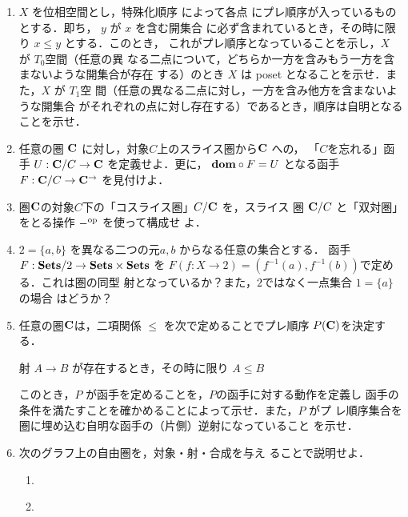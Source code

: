 \begin{enumerate}
\begin{enumerate}
{	      しない}ことを示せ．
       \end{enumerate}
 \item $X$ を位相空間とし，特殊化順序
       によって各点
       にプレ順序が入っているものとする．即ち， $y$ が $x$ を含む開集合
       に必ず含まれているとき，その時に限り $x \leq y$ とする．このとき，
       これがプレ順序となっていることを示し，$X$ が $T_0$空間（任意の異
       なる二点について，どちらか一方を含みもう一方を含まないような開集合が存在
       する）のとき $X$ は poset となることを示せ．また，$X$ が $T_1$空
       間（任意の異なる二点に対し，一方を含み他方を含まないような開集合
       がそれぞれの点に対し存在する）であるとき，順序は自明となることを示せ．
 \item 任意の圏 ${\bf C}$ に対し，対象$C$上のスライス圏から${\bf C}$ への，
       「$C$を忘れる」函手 $U: {\bf C}/C \to {\bf C}$ を定義せよ．更に，
       ${\bf dom} \circ F = U$ となる函手 $F: {\bf C}/C \to {\bf C}^{\to}$
       を見付けよ．
 \item 圏${\bf C}$の対象$C$下の「コスライス圏」$C/{\bf C}$ を，スライス
       圏 ${\bf C}/C$ と「双対圏」をとる操作 $-^{\rm op}$ を使って構成せ
       よ．
 \item $2 = \{a, b\}$ を異なる二つの元$a, b$ からなる任意の集合とする．
       函手 $F: \mathbf{Sets}/2 \to \mathbf{Sets} \times \mathbf{Sets}$ を
       $F(f: X \to 2) = (f^{-1}(a), f^{-1}(b))$で定める．これは圏の同型
       射となっているか？また，$2$ではなく一点集合 $1 = \{a\}$ の場合
       はどうか？
 \item 任意の圏${\bf C}$は，二項関係 $\leq$ を次で定めることでプレ順序
       $P({\bf C})$を決定する．
       \begin{center}
	射 $A \rightarrow B$ が存在するとき，その時に限り $A \leq B$
       \end{center}
       このとき，$P$ が函手を定めることを，$P$の函手に対する動作を定義し
       函手の条件を満たすことを確かめることによって示せ．また，$P$ がプ
       レ順序集合を圏に埋め込む自明な函手の（片側）逆射になっていること
       を示せ．
 \item 次のグラフ上の自由圏を，対象・射・合成を与え
       ることで説明せよ．
       \begin{enumerate}
	\item 　
	      
	       \begin{center}
	       \end{center}
	\item 　
	      

\end{enumerate}
\end{enumerate}
